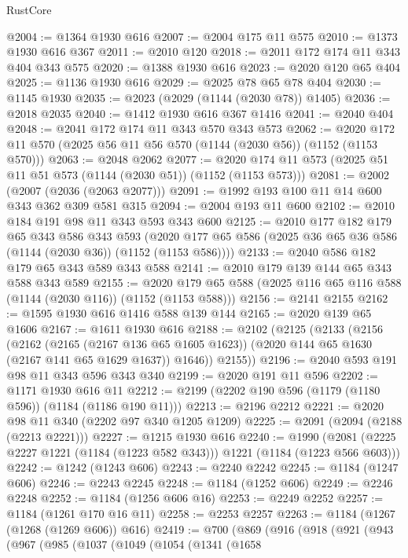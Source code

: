 \begin{lexlean}{RustCore}
\begin{coremodule}
@2004 := @1364 @1930 @616
@2007 := @2004 @175 @11 @575
@2010 := @1373 @1930 @616 @367
@2011 := @2010 @120
@2018 := @2011 @172 @174 @11 @343 @404 @343 @575
@2020 := @1388 @1930 @616
@2023 := @2020 @120 @65 @404
@2025 := @1136 @1930 @616
@2029 := @2025 @78 @65 @78 @404
@2030 := @1145 @1930
@2035 := @2023 (@2029 (@1144 (@2030 @78)) @1405)
@2036 := @2018 @2035
@2040 := @1412 @1930 @616 @367 @1416
@2041 := @2040 @404
@2048 := @2041 @172 @174 @11 @343 @570 @343 @573
@2062 := @2020 @172 @11 @570 (@2025 @56 @11 @56 @570 (@1144 (@2030 @56)) (@1152 (@1153 @570)))
@2063 := @2048 @2062
@2077 := @2020 @174 @11 @573 (@2025 @51 @11 @51 @573 (@1144 (@2030 @51)) (@1152 (@1153 @573)))
@2081 := @2002 (@2007 (@2036 (@2063 @2077)))
@2091 := @1992 @193 @100 @11 @14 @600 @343 @362 @309 @581 @315
@2094 := @2004 @193 @11 @600
@2102 := @2010 @184 @191 @98 @11 @343 @593 @343 @600
@2125 := @2010
    @177
    @182
    @179
    @65
    @343
    @586
    @343
    @593
    (@2020 @177 @65 @586 (@2025 @36 @65 @36 @586 (@1144 (@2030 @36)) (@1152 (@1153 @586))))
@2133 := @2040 @586 @182 @179 @65 @343 @589 @343 @588
@2141 := @2010 @179 @139 @144 @65 @343 @588 @343 @589
@2155 := @2020 @179 @65 @588 (@2025 @116 @65 @116 @588 (@1144 (@2030 @116)) (@1152 (@1153 @588)))
@2156 := @2141 @2155
@2162 := @1595 @1930 @616 @1416 @588 @139 @144
@2165 := @2020 @139 @65 @1606
@2167 := @1611 @1930 @616
@2188 := @2102
    (@2125
      (@2133
        (@2156
          (@2162
            (@2165 (@2167 @136 @65 @1605 @1623))
            (@2020 @144 @65 @1630 (@2167 @141 @65 @1629 @1637))
            @1646))
        @2155))
@2196 := @2040 @593 @191 @98 @11 @343 @596 @343 @340
@2199 := @2020 @191 @11 @596
@2202 := @1171 @1930 @616 @11
@2212 := @2199 (@2202 @190 @596 (@1179 (@1180 @596)) (@1184 (@1186 @190 @11)))
@2213 := @2196 @2212
@2221 := @2020 @98 @11 @340 (@2202 @97 @340 @1205 @1209)
@2225 := @2091 (@2094 (@2188 (@2213 @2221)))
@2227 := @1215 @1930 @616
@2240 := @1990 (@2081 (@2225 @2227 @1221 (@1184 (@1223 @582 @343))) @1221 (@1184 (@1223 @566 @603)))
@2242 := @1242 (@1243 @606)
@2243 := @2240 @2242
@2245 := @1184 (@1247 @606)
@2246 := @2243 @2245
@2248 := @1184 (@1252 @606)
@2249 := @2246 @2248
@2252 := @1184 (@1256 @606 @16)
@2253 := @2249 @2252
@2257 := @1184 (@1261 @170 @16 @11)
@2258 := @2253 @2257
@2263 := @1184 (@1267 (@1268 (@1269 @606)) @616)
@2419 := @700
    (@869
      (@916
        (@918
          (@921
            (@943
              (@967
                (@985
                  (@1037
                    (@1049
                      (@1054
                        (@1341
                          (@1658

\end{coremodule}
\end{lexlean}
